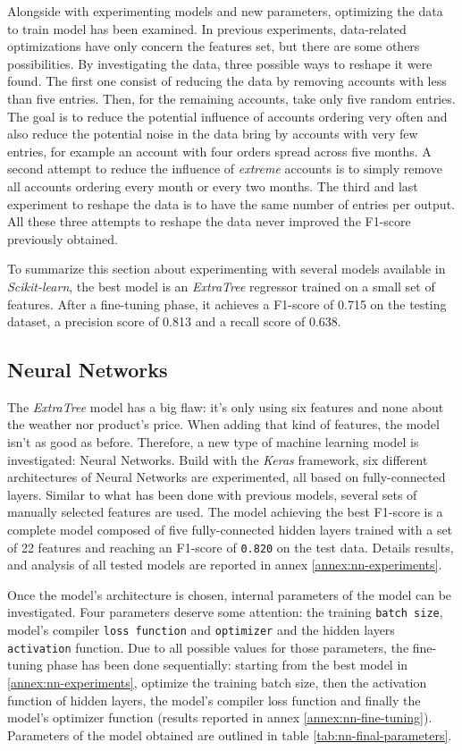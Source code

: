 Alongside with experimenting models and new parameters, optimizing the data to train model has been examined. In previous experiments, data-related optimizations have only concern the features set, but there are some others possibilities. By investigating the data, three possible ways to reshape it were found. 
The first one consist of reducing the data by removing accounts with less than five entries. Then, for the remaining accounts, take only five random entries. The goal is to reduce the potential influence of accounts ordering very often and also reduce the potential noise in the data bring by accounts with very few entries, for example an account with four orders spread across five months. A second attempt to reduce the influence of \textit{extreme} accounts is to simply remove all accounts ordering every month or every two months. The third and last experiment to reshape the data is to have the same number of entries per output. All these three attempts to reshape the data never improved the F1-score previously obtained.

To summarize this section about experimenting with several models available in \textit{Scikit-learn}, the best model is an \textit{ExtraTree} regressor trained on a small set of features. After a fine-tuning phase, it achieves a F1-score of 0.715 on the testing dataset, a precision score of 0.813 and a recall score of 0.638.


\subsection{Neural Networks}
The \textit{ExtraTree} model has a big flaw: it's only using six features and none about the weather nor product's price. When adding that kind of features, the model isn't as good as before. Therefore, a new type of machine learning model is investigated: Neural Networks. Build with the \textit{Keras} framework, six different architectures of Neural Networks are experimented, all based on fully-connected layers. Similar to what has been done with previous models, several sets of manually selected features are used. The model achieving the best F1-score is a complete model composed of five fully-connected hidden layers trained with a set of 22 features and reaching an F1-score of \texttt{0.820} on the test data. Details results, and analysis of all tested models are reported in annex \ref{annex:nn-experiments}.

Once the model's architecture is chosen, internal parameters of the model can be investigated. Four parameters deserve some attention: the training \texttt{batch size}, model's compiler \texttt{loss function} and \texttt{optimizer} and the hidden layers \texttt{activation} function. Due to all possible values for those parameters, the fine-tuning phase has been done sequentially: starting from the best model in \ref{annex:nn-experiments}, optimize the training batch size, then the activation function of hidden layers, the model's compiler loss function and finally the model's optimizer function (results reported in annex \ref{annex:nn-fine-tuning}). Parameters of the model obtained are outlined in table \ref{tab:nn-final-parameters}.


